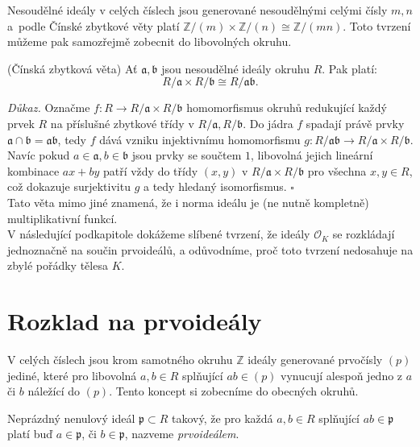 \documentclass [12pt]{report}
\begin{document}
Nesoudělné ideály v celých číslech jsou generované nesoudělnými celými čísly $m,n$ a~podle Čínské zbytkové věty platí $\mathbb{Z}/(m) \times \mathbb{Z}/(n) \cong \mathbb{Z}/(mn)$. Toto tvrzení můžeme pak samozřejmě zobecnit do libovolných okruhu.

\begin{veta}(Čínská zbytková věta)\label{CRT}
Ať $\mathfrak{a},\mathfrak{b}$ jsou nesoudělné ideály okruhu $R$. Pak platí:
\begin{equation*}
R/\mathfrak{a} \times R/\mathfrak{b} \cong R/\mathfrak{ab}.
\end{equation*}
\end{veta} 
\noindent \textit{Důkaz.} Označme $f : R \longrightarrow R/\mathfrak{a} \times R/\mathfrak{b}$ homomorfismus okruhů redukující každý prvek $R$ na příslušné zbytkové třídy v $R/\mathfrak{a},R/\mathfrak{b}$. Do jádra $f$ spadají právě prvky $\mathfrak{a} \cap \mathfrak{b} = \mathfrak{ab}$, tedy $f$ dává vzniku injektivnímu homomorfismu $g : R/\mathfrak{ab} \longrightarrow R/\mathfrak{a} \times R/\mathfrak{b}$. Navíc pokud $a \in \mathfrak{a}, b\in \mathfrak{b}$ jsou prvky se součtem $1$, libovolná jejich lineární kombinace $ax+by$ patří vždy do třídy $(x,y)$ v $R/\mathfrak{a} \times R/\mathfrak{b}$ pro všechna $x,y \in R$, což dokazuje surjektivitu $g$ a tedy hledaný isomorfismus. \hfill $\square$\\

Tato věta mimo jiné znamená, že i norma ideálu je (ne nutně kompletně) multiplikativní funkcí.\\

V následující podkapitole dokážeme slíbené tvrzení, že ideály $\mathcal{O}_K$ se rozkládají jednoznačně na součin prvoideálů, a odůvodníme, proč toto tvrzení nedosahuje na zbylé pořádky tělesa $K$.

\section{Rozklad na prvoideály}


V celých číslech jsou krom samotného okruhu $\mathbb{Z}$ ideály generované prvočísly $(p)$ jediné, které pro libovolná $a,b \in R$ splňující $ab \in (p)$ vynucují alespoň jedno z $a$ či $b$ náležící do $(p)$. Tento koncept si zobecníme do obecných okruhů.

\begin{definice}
Neprázdný nenulový ideál $\mathfrak{p} \subset R$ takový, že pro každá $a,b \in R$ splňující $ab \in \mathfrak{p}$ platí buď $a \in \mathfrak{p}$, či $b \in \mathfrak{p}$, nazveme \textit{prvoideálem}.
\end{definice}
\end{document}

